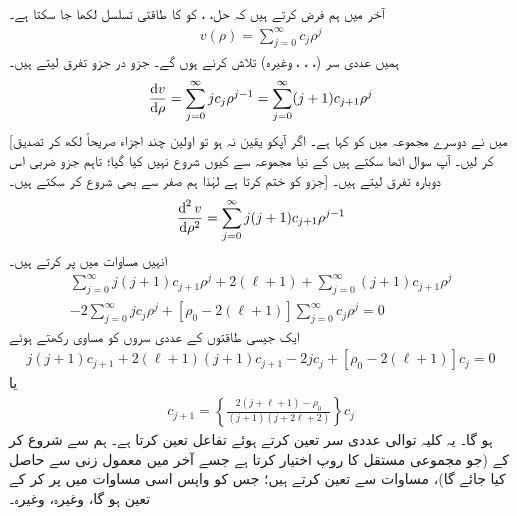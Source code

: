   آخر میں ہم فرض کرتے ہیں کہ حل،   ،  کو  کا طاقتی تسلسل لکھا جا سکتا ہے۔
  \begin{align}
v(\rho)=\sum_{j=0}^{\infty}c_{j}\rho^{j} 
\end{align}
ہمیں عددی سر (، ، ، وغیرہ) تلاش کرنے ہوں گے۔  جزو در جزو تفرق لیتے ہیں۔
\begin{align*}
\frac{\dif{v}}{\dif{\rho}}=\sum_{j=0}^{\infty}jc_{j}\rho^{j-1}=\sum_{j=0}^{\infty}(j+1)c_{j+1}\rho^{j} 
\end{align*}
[میں نے دوسرے مجموعہ میں   کو  کہا ہے۔ اگر آپکو یقین نہ  ہو تو اولین چند اجزاء صریحاً لکھ کر تصدیق کر لیں۔ آپ سوال اٹھا سکتے ہیں کے نیا مجموعہ   سے کیوں  شروع نہیں کیا گیا؛ تاہم جزو ضربی   اس جزو کو ختم کرتا ہے لہٰذا ہم صفر سے بھی شروع کر سکتے ہیں۔] دوبارہ تفرق لیتے ہیں۔
\begin{align*}
\frac{\dif^{\,2}{v}}{\dif{\rho^{2}}}=\sum_{j=0}^{\infty}j(j+1)c_{j+1}\rho^{j-1} 
\end{align*}
انہیں مساوات  میں پر کرتے ہیں۔
\begin{multline*}
\sum_{j=0}^{\infty}j(j+1)c_{j+1}\rho^{j}+2(\ell+1)+\sum_{j=0}^{\infty}(j+1)c_{j+1}\rho^{j} \\
-2\sum_{j=0}^{\infty}jc_{j}\rho^{j}+[\rho_{0}-2(\ell+1)]\sum_{j=0}^{\infty}c_{j}\rho^{j}=0 
\end{multline*}
ایک جیسی طاقتوں کے عددی سروں کو مساوی رکھتے ہوئے
\begin{align*}
j(j+1)c_{j+1}+2(\ell+1)(j+1)c_{j+1}-2jc_{j}+[\rho_{0}-2(\ell+1)]c_{j}=0 
\end{align*}
یا
\begin{align}\label{مساوات_ابعادی_کولمب_کلیہ_توالی}
c_{j+1}=\left\{\frac{2(j+\ell+1)-\rho_{0}}{(j+1)(j+2\ell+2)}\right\}c_{j} 
\end{align}
ہو گا۔ یہ کلیہ توالی عددی سر تعین کرتے ہوئے تفاعل  تعین کرتا ہے۔ ہم  سے شروع کر کے (جو مجموعی مستقل کا روپ اختیار کرتا ہے جسے آخر میں معمول زنی سے حاصل کیا جائے گا)، مساوات   سے  تعین کرتے ہیں؛ جس کو واپس اسی مساوات میں پر کر کے  تعین ہو گا، وغیرہ، وغیرہ۔

